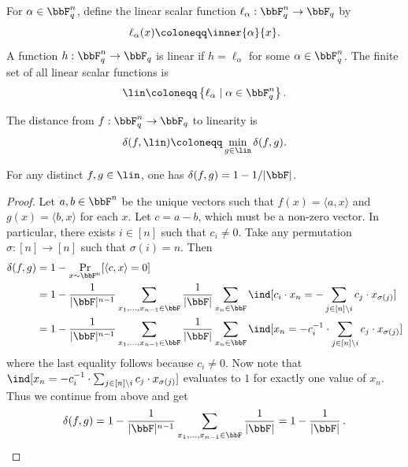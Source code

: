 \begin{definition}
\label{def:linear-functions}
\leanok
For $\alpha\in\bbF_q^n$, define the linear scalar function
$\ell_\alpha:\bbF_q^n\to\bbF_q$ by
\[
    \ell_\alpha(x) \coloneqq \inner{\alpha}{x}.
\]
A function $h:\bbF_q^n\to\bbF_q$ is linear if $h=\ell_\alpha$ for some
$\alpha\in\bbF_q^n$. The finite set of all linear scalar functions is
\[
    \lin
    \coloneqq
    \left\{\ell_\alpha \mid \alpha\in\bbF_q^n\right\}.
\]
\end{definition}

\begin{definition}
\label{def:distance-to-linearity}
\leanok
The distance from $f:\bbF_q^n\to\bbF_q$ to linearity is
\[
    \delta(f,\lin) \coloneqq \min_{g\in\lin}\delta(f,g).
\]
\end{definition}



\begin{lemma}
\label{lem:linear-set-well-separated}
\leanok
For any distinct $f,g \in \lin$, one has $\delta(f,g)= 1-1/|\bbF|$.
\end{lemma}
\begin{proof}\leanok
Let $a,b \in \bbF^n$ be the unique vectors such that $f(x) = \langle a, x\rangle$ and $g(x) = \langle b, x\rangle$ for each $x$.
Let $c = a-b$, which must be a non-zero vector. In particular, there exists $i \in [n]$ such that $c_i \neq 0$. Take any permutation $\sigma: [n] \rightarrow [n]$ such that $\sigma(i)=n$. Then
\begin{align*}
    \delta(f,g) & = 1- \Pr_{x \sim \bbF^n}[\langle c, x\rangle =0] \\
    & = 1 - \frac{1}{|\bbF|^{n-1}}\sum_{x_1,\dots,x_{n-1} \in \bbF}\frac{1}{|\bbF|}\sum_{x_n \in \bbF} \ind[c_i \cdot x_n = -\sum_{j \in [n]\setminus {i}} c_j \cdot x_{\sigma(j)}] \\
    & = 1 - \frac{1}{|\bbF|^{n-1}}\sum_{x_1,\dots,x_{n-1} \in \bbF}\frac{1}{|\bbF|}\sum_{x_n \in \bbF} \ind[x_n = -c_i^{-1} \cdot \sum_{j \in [n]\setminus {i}} c_j \cdot x_{\sigma(j)}] 
\end{align*}
where the last equality follows because $c_i \neq 0$. Now note that  $\ind[x_n = -c_i^{-1} \cdot \sum_{j \in [n]\setminus {i}} c_j \cdot x_{\sigma(j)}]$ evaluates to $1$ for exactly one value of $x_n$. Thus we continue from above and get
\begin{align*}
    \delta(f,g) = 1-\frac{1}{|\bbF|^{n-1}}\sum_{x_1,\dots,x_{n-1} \in \bbF}\frac{1}{|\bbF|} = 1-\frac{1}{|\bbF|} \, .
\end{align*}
\end{proof}


